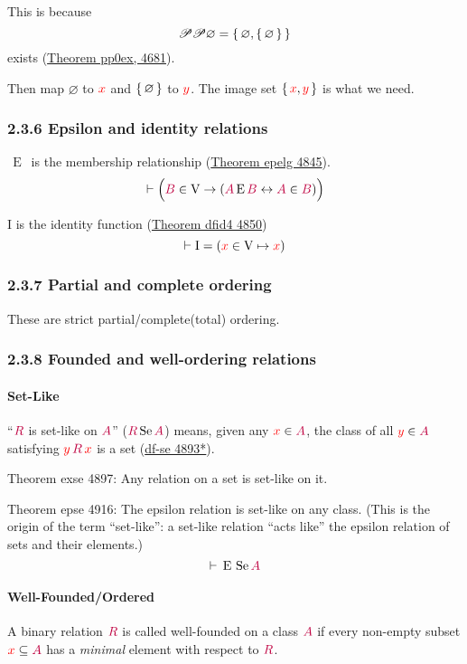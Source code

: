 \documentclass[12pt, letterpaper]{article}
\newcommand{\red}[1]{{\color{red} #1}}
\newcommand{\purple}[1]{{\color{purple} #1}}
\renewcommand{\emptyset}{\varnothing}
\newcommand{\provable}{\vdash}
\newcommand{\ra}{\rightarrow}
\newcommand{\lra}{\leftrightarrow}
\newcommand{\setvar}{\red}
\newcommand{\classvar}{\purple}
\newcommand{\sx}{\setvar{x}}
\newcommand{\sy}{\setvar{y}}
\newcommand{\clA}{\classvar{A}}
\newcommand{\clB}{\classvar{B}}
\newcommand{\clR}{\classvar{R}}
\newcommand{\Se}{{\,\mathrm{Se}\,}}
\newcommand{\VV}{\mathrm{V}}
\newcommand{\relE}{{\,\operatorname{E}\,}}
\newcommand{\II}{\mathrm{I}}
\newcommand{\power}{\mathscr{P}}
\theoremstyle{definition}
\theoremstyle{remark}
\theoremstyle{definition}
\theoremstyle{plain}
\begin{document}
	This is because
	\[\power\power\emptyset=\set{\emptyset,\set{\emptyset}} \]	
	exists (\href{http://us.metamath.org/mpeuni/mmtheorems47.html}{Theorem pp0ex, 4681}).
	
	Then map $\emptyset$ to $\sx$ and $\set{\emptyset}$ to $\sy$. The image set $\set{\sx,\sy}$ is what we need.
	
	\subsubsection*{2.3.6  Epsilon and identity relations}
	$\relE$ is the membership relationship
	(\href{http://us.metamath.org/mpeuni/mmtheorems49.html#mm4842s}{Theorem	epelg 4845}).
	\[\provable\Big(\clB\in\VV\ra(\clA\relE\clB\lra\clA\in\clB)\Big)\]
	
	$\II$ is the identity function
	(\href{http://us.metamath.org/mpeuni/mmtheorems49.html#mm4842s}{Theorem	dfid4 4850})
	\[\provable \II=(\sx\in\VV\mapsto\sx) \]
	
	\subsubsection*{2.3.7  Partial and complete ordering}
	These are strict partial/complete(total) ordering.
	
	\subsubsection*{2.3.8  Founded and well-ordering relations}

	\paragraph{Set-Like}	
	``$\clR$ is set-like on $\clA$'' ($\clR\Se\clA$) means,
	given any $\sx\in\clA$, the class of all $\sy\in\clA$ satisfying $\sy\,\clR\,\sx$ is a set
	(\href{http://us.metamath.org/mpeuni/mmtheorems49.html#mm4889s}{df-se 4893*}).
	
	Theorem exse 4897: Any relation on a set is set-like on it.
		
	Theorem	epse 4916: The epsilon relation is set-like on any class.
	(This is the origin of the term ``set-like'':
	a set-like relation ``acts like'' the epsilon relation of sets and their elements.)
	\[\provable \relE\Se\clA \]
	
	\paragraph{Well-Founded/Ordered}
	A binary relation $\clR$ is called well-founded on a class $\clA$
	if every non-empty subset $\sx\subseteq\clA$ has a \textit{minimal} element with respect to $\clR$.
	
\end{document}
